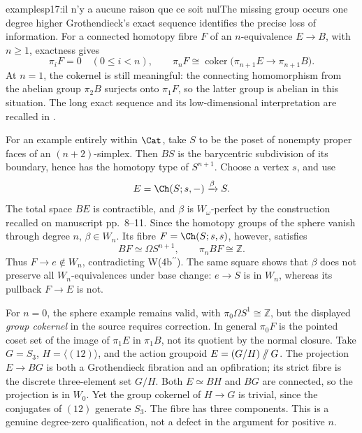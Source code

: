 \begin{dcomment}{examples}{p17:il n'y a aucune raison que ce soit nul}{The missing group occurs one degree higher}
Grothendieck's exact sequence identifies the precise loss of information. For a connected homotopy fibre \(F\) of an \(n\)-equivalence \(E\to B\), with \(n\geq1\), exactness gives
\[
 \pi_iF=0\quad(0\leq i<n),\qquad
 \pi_nF\cong
 \operatorname{coker}\bigl(\pi_{n+1}E\to\pi_{n+1}B\bigr).
\]
At \(n=1\), the cokernel is still meaningful: the connecting homomorphism from the abelian group \(\pi_2B\) surjects onto \(\pi_1F\), so the latter group is abelian in this situation. The long exact sequence and its low-dimensional interpretation are recalled in \citet[Theorem~4.41]{Hatcher2002}.

For an example entirely within \(\Cat\), take \(S\) to be the poset of nonempty proper faces of an \((n+2)\)-simplex. Then \(BS\) is the barycentric subdivision of its boundary, hence has the homotopy type of \(S^{n+1}\). Choose a vertex \(s\), and use
\[
 E=\Ch(S;s,-)\xrightarrow{\beta}S .
\]
The total space \(BE\) is contractible, and \(\beta\) is \(W_\omega\)-perfect by the construction recalled on manuscript pp.~8--11. Since the homotopy groups of the sphere vanish through degree \(n\), \(\beta\in W_n\). Its fibre \(F=\Ch(S;s,s)\), however, satisfies
\[
 BF\simeq\Omega S^{n+1},\qquad \pi_n BF\cong\mathbb Z.
\]
Thus \(F\to e\notin W_n\), contradicting W(4b\(^{\prime\prime}\)). The same square shows that \(\beta\) does not preserve all \(W_n\)-equivalences under base change: \(e\to S\) is in \(W_n\), whereas its pullback \(F\to E\) is not.

For \(n=0\), the sphere example remains valid, with \(\pi_0\Omega S^1\cong\mathbb Z\), but the displayed \emph{group cokernel} in the source requires correction. In general \(\pi_0F\) is the pointed coset set of the image of \(\pi_1E\) in \(\pi_1B\), not its quotient by the normal closure. Take \(G=S_3\), \(H=\langle(12)\rangle\), and the action groupoid \(E=(G/H)\mathbin{/\mkern-6mu/}G\). The projection \(E\to BG\) is both a Grothendieck fibration and an opfibration; its strict fibre is the discrete three-element set \(G/H\). Both \(E\simeq BH\) and \(BG\) are connected, so the projection is in \(W_0\). Yet the group cokernel of \(H\to G\) is trivial, since the conjugates of \((12)\) generate \(S_3\). The fibre has three components. This is a genuine degree-zero qualification, not a defect in the argument for positive \(n\).
\end{dcomment}

